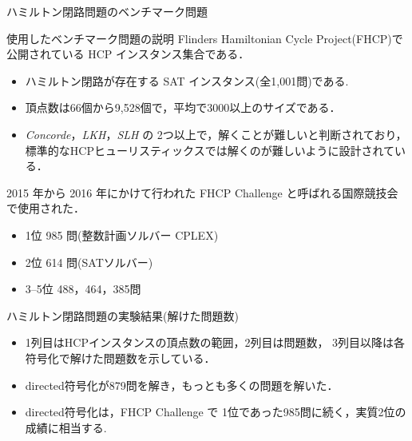 \documentclass[dvipdfmx,10pt]{beamer}
\begin{document}
\begin{frame}{ハミルトン閉路問題のベンチマーク問題}
\begin{block}{使用したベンチマーク問題の説明}
Flinders Hamiltonian Cycle Project(FHCP)\footnotemark で
公開されている HCP インスタンス集合である．
\begin{itemize}
 \item ハミルトン閉路が存在する\alert{ SAT インスタンス(全1,001問)}である.
 \item 頂点数は66個から9,528個で，平均で3000以上のサイズである．
 \item \textit{Concorde}，\textit{LKH}，\textit{SLH} の
       2つ以上で，解くことが難しいと判断されており，
       標準的なHCPヒューリスティックスでは解くのが難しいように設計されている．
\end{itemize}
\end{block}
2015 年から 2016 年にかけて行われた FHCP Challenge と呼ばれる国際競技会で使用された．
\begin{itemize}
\item 1位 985 問(整数計画ソルバー CPLEX)
\item 2位 614 問(SATソルバー)
\item 3--5位 488，464，385問
\end{itemize}
\end{frame}
\begin{frame}{ハミルトン閉路問題の実験結果(解けた問題数)}
\begin{itemize}
\item 1列目はHCPインスタンスの頂点数の範囲，2列目は問題数，
      3列目以降は各符号化で解けた問題数を示している．
\item \textsf{directed}符号化が879問を解き，もっとも多くの問題を解いた．
\item \textsf{directed}符号化は，FHCP Challenge で
      1位であった985問に続く，実質2位の成績に相当する.
\end{itemize}
\end{frame}
\end{document}
